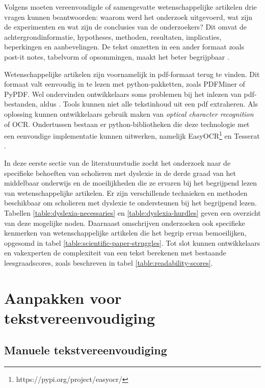\medspace

Volgens \textcite{Hollenkamp2020} moeten vereenvoudigde of samengevatte wetenschappelijke artikelen drie vragen kunnen beantwoorden: waarom werd het onderzoek uitgevoerd, wat zijn de experimenten en wat zijn de conclusies van de onderzoekers? Dit omvat de achtergrondinformatie, hypotheses, methoden, resultaten, implicaties, beperkingen en aanbevelingen. De tekst omzetten in een ander formaat zoals post-it notes, tabelvorm of opsommingen, maakt het beter begrijpbaar \autocite{Rijkhoff2022}. 

\medspace

Wetenschappelijke artikelen zijn voornamelijk in pdf-formaat terug te vinden. Dit formaat valt eenvoudig in te lezen met python-pakketten, zoals PDFMiner of PyPDF. Wel ondervinden ontwikkelaars soms problemen bij het inlezen van pdf-bestanden, aldus \textcite{Lee2021}. Tools kunnen niet alle tekstinhoud uit een pdf extraheren. Als oplossing kunnen ontwikkelaars gebruik maken van \textit{optical character recognition} of OCR. Ondertussen bestaan er python-bibliotheken die deze technologie met een eenvoudige implementatie kunnen uitwerken, namelijk EasyOCR\footnote{https://pypi.org/project/easyocr/} en Tesserat \autocite{Lee2021}.

\medspace

In deze eerste sectie van de literatuurstudie zocht het onderzoek naar de specifieke behoeften van scholieren met dyslexie in de derde graad van het middelbaar onderwijs en de moeilijkheden die ze ervaren bij het begrijpend lezen van wetenschappelijke artikelen. Er zijn verschillende technieken en methoden beschikbaar om scholieren met dyslexie te ondersteunen bij het begrijpend lezen. Tabellen \ref{table:dyslexia-necessaries} en \ref{table:dyslexia-hurdles} geven een overzicht van deze mogelijke noden. Daarnaast omschrijven onderzoeken ook specifieke kenmerken van wetenschappelijke artikelen die het begrip ervan bemoeilijken, opgesomd in tabel \ref{table:scientific-paper-struggles}. Tot slot kunnen ontwikkelaars en vakexperten de complexiteit van een tekst berekenen met bestaande leesgraadscores, zoals beschreven in tabel \ref{table:readability-scores}.

\section{Aanpakken voor tekstvereenvoudiging}

\subsection{Manuele tekstvereenvoudiging}

